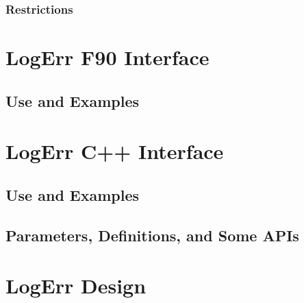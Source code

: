 \documentclass[]{article}
\begin{document}
\subsubsection{Restrictions}




\section{LogErr F90 Interface}

\subsection{Use and Examples}








%



\section{LogErr C++ Interface}

\subsection{Use and Examples}




\subsection{Parameters, Definitions, and Some APIs}








\section{LogErr Design}
\end{document}
